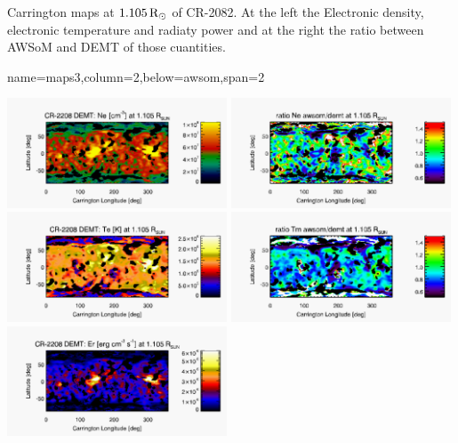 \documentclass[paperwidth=100cm,paperheight=120cm]{baposter}
\def\azul#1{\textcolor{blue}{#1}}
\begin{document}
\begin{poster}
{\begin{center}
\end{center}
\vskip -0.16cm
{\footnotesize\sf
Carrington maps at $1.105\, {\rm R}_\odot$ of CR-2082. At the left the Electronic density, electronic temperature and radiaty power and at the right the ratio between AWSoM and DEMT of those cuantities.
}
}

{name=maps3,column=2,below=awsom,span=2}{
{\footnotesize\sf
\begin{center}
{\includegraphics[width=0.49\textwidth]{map_Ne_CR2208_DEMT-AIA_H1_L522_r3d_1105_Rsun.pdf}}
{\includegraphics[width=0.49\textwidth]{map_ratio_Ne_awsom_2208_185-Ne_CR2208_DEMT-AIA_H1_L522_r3d_1105_Rsun.pdf}}
{\includegraphics[width=0.49\textwidth]{map_Tm_CR2208_DEMT-AIA_H1_L522_r3d_1105_Rsun.pdf}}
{\includegraphics[width=0.49\textwidth]{map_ratio_Te_awsom_2208_185-Tm_CR2208_DEMT-AIA_H1_L522_r3d_1105_Rsun.pdf}}
{\includegraphics[width=0.49\textwidth]{map_Er_CR2208_DEMT-EUVI_behind_H1-L502020_r3d_1105_Rsun.pdf}}

\end{center}}}
\end{poster}
\end{document}

